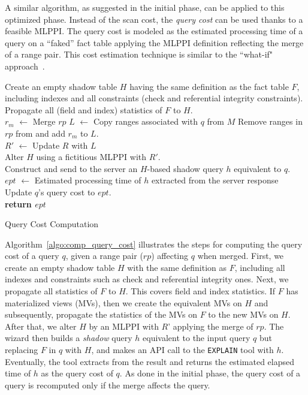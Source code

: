 \documentclass[paper]{ieice}
\begin{document}
A similar algorithm, as suggested in the initial phase, 
can be applied to this optimized phase. 
Instead of the scan cost, the {\em query cost} can be used thanks to a feasible MLPPI. 
The query cost is modeled as the estimated processing time 
of a query on a ``faked'' fact table applying the MLPPI definition 
reflecting the merge of a range pair. 
This cost estimation technique is similar 
to the ``\hbox{what-if}" approach~\cite{chaudhuri1998autoadmin}.

\begin{algorithm}[t]
{
	Create an empty shadow table $H$ having the same definition as the fact table $F$, 
	including indexes and all constraints (check and referential integrity constraints). \\
	Propagate all (field and index) statistics of $F$ to $H$. \\
	$r_{m}$ $\leftarrow$ Merge $rp$ \;
	$L$ $\leftarrow$ Copy ranges associated with $q$ from $M$\; 
	Remove ranges in $rp$ from and add $r_{m}$ to $L$. \\
	$R'$ $\leftarrow$ Update $R$ with $L$ \\
	Alter $H$ using a fictitious MLPPI with $R'$. \\
	Construct and send to the server an $H$-based shadow query $h$ equivalent to $q$. \\	
	$ept$ $\leftarrow$ Estimated processing time of $h$ extracted from the server response \;
	Update $q$'s query cost to $ept$. \\
	{\bf return $ept$} 
}
\caption{Query Cost Computation}
\label{algo:comp_query_cost}
\end{algorithm}

Algorithm~\ref{algo:comp_query_cost} illustrates the steps for computing 
the query cost of a query $q$, 
given a range pair ($rp$) affecting $q$ when merged. 
First, we create an empty shadow table $H$ with the same definition as $F$, 
including all indexes and constraints such as check and referential integrity 
ones. Next, we propagate all statistics of $F$ to $H$. 
This covers field and index statistics. 
If $F$ has materialized views (MVs), then we create the equivalent MVs on $H$ and subsequently, 
propagate the statistics of the MVs on $F$ to the new MVs on $H$. 
After that, we alter $H$ by an MLPPI with $R$' applying the merge of $rp$. 
The wizard then builds a {\em shadow} query $h$ equivalent to the input query $q$ 
but replacing $F$ in $q$ with $H$, and makes an API call to the {\tt EXPLAIN} tool with $h$. 
Eventually, the tool extracts from the result and returns the estimated elapsed time 
of $h$ as the query cost of $q$. 
As done in the initial phase, the query cost of a query is recomputed only if the merge affects the query.
\end{document}
